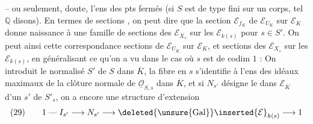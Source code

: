 -- ou seulement,  doute, l'ens des pts fermés (si $S$ est de type fini sur un corps, tel $\mathbb Q$ disons). En termes de sections , on peut dire que la section $\mathcal E_{f_K}$ de $\mathcal E_{U_K}$ sur $\mathcal E_K$ donne naissance à une famille de sections des $\mathcal E_{X_s}$ sur les $\mathcal E_{k(s)}$ pour $s\in S'$. On peut   ainsi cette correspondance  sections de $\mathcal E_{U_K}$ sur $\mathcal E_K$, et sections des $\mathcal E_{X_s}$ sur les $\mathcal E_{k(s)}$, en généralisant ce qu'on a vu dans le cas où $s$ est de codim $1$ : On introduit le normalisé $S'$ de $S$ dans $\overline K$, la fibre en $s$ s'identifie à l'ens des idéaux maximaux de la clôture normale de $\underline{\mathcal O}_{S,s}$ dans $\overline K$, et si $N_{s'}$ désigne le   dans $\mathcal E_{\overline K}$ d'un $s'$ de $S'_s$, on a encore une structure d'extension
\[
(29)\qquad
1\mathrel{\text{---}}I_{s'}\longrightarrow N_{s'}\longrightarrow {\deleted{\unsure{\operatorname{Gal}}}\inserted{\mathcal E}}_{k(s)}\longrightarrow 1
\]
